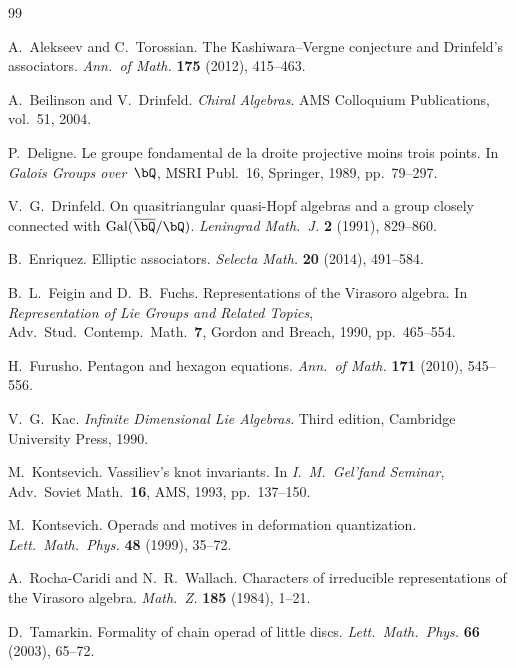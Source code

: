 \documentclass[11pt,reqno]{amsart}
\theoremstyle{definition}
\theoremstyle{remark}
\numberwithin{equation}{section}
\begin{document}
\begin{thebibliography}{99}

A.~Alekseev and C.~Torossian.
\newblock The Kashiwara--Vergne conjecture and Drinfeld's
 associators.
\newblock \emph{Ann.~of Math.} \textbf{175} (2012), 415--463.

A.~Beilinson and V.~Drinfeld.
\newblock \emph{Chiral Algebras}.
\newblock AMS Colloquium Publications, vol.~51, 2004.

P.~Deligne.
\newblock Le groupe fondamental de la droite projective moins
 trois points.
\newblock In \emph{Galois Groups over~$\bQ$}, MSRI Publ.~16,
 Springer, 1989, pp.~79--297.

V.~G.~Drinfeld.
\newblock On quasitriangular quasi-Hopf algebras and a group
 closely connected with $\mathrm{Gal}(\overline{\bQ}/\bQ)$.
\newblock \emph{Leningrad Math.~J.} \textbf{2} (1991), 829--860.

B.~Enriquez.
\newblock Elliptic associators.
\newblock \emph{Selecta Math.} \textbf{20} (2014), 491--584.

B.~L.~Feigin and D.~B.~Fuchs.
\newblock Representations of the Virasoro algebra.
\newblock In \emph{Representation of Lie Groups and Related
 Topics}, Adv.~Stud.~Contemp.~Math.~\textbf{7}, Gordon and
 Breach, 1990, pp.~465--554.

H.~Furusho.
\newblock Pentagon and hexagon equations.
\newblock \emph{Ann.~of Math.} \textbf{171} (2010), 545--556.

V.~G.~Kac.
\newblock \emph{Infinite Dimensional Lie Algebras}.
\newblock Third edition, Cambridge University Press, 1990.

M.~Kontsevich.
\newblock Vassiliev's knot invariants.
\newblock In \emph{I.~M.~Gel'fand Seminar}, Adv.~Soviet
 Math.~\textbf{16}, AMS, 1993, pp.~137--150.

M.~Kontsevich.
\newblock Operads and motives in deformation quantization.
\newblock \emph{Lett.~Math.~Phys.} \textbf{48} (1999), 35--72.

A.~Rocha-Caridi and N.~R.~Wallach.
\newblock Characters of irreducible representations of the
 Virasoro algebra.
\newblock \emph{Math.~Z.} \textbf{185} (1984), 1--21.

D.~Tamarkin.
\newblock Formality of chain operad of little discs.
\newblock \emph{Lett.~Math.~Phys.} \textbf{66} (2003), 65--72.


\end{thebibliography}
\end{document}
